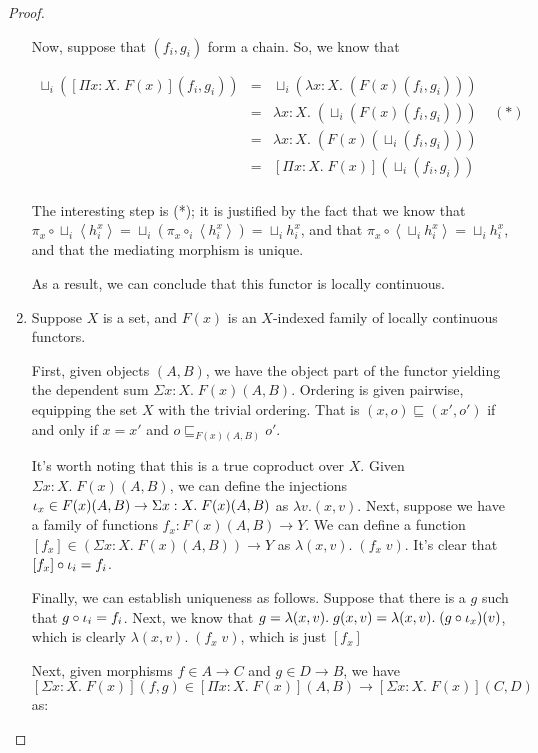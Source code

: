 \begin{proof}
\begin{enumerate}
Now, suppose that $(f_i,g_i)$ form a chain. So, we know that 

\begin{displaymath}
\begin{array}{lcl}
\sqcup_i ([\Pi x:X.\; F(x)](f_i,g_i)) & = & 
  \sqcup_i (\lambda x:X.\; (F(x) (f_i, g_i))) \\
& = & 
  \lambda x:X.\; (\sqcup_i (F(x) (f_i, g_i))) \;\;\;\;(*) \\
& = & 
  \lambda x:X.\; (F(x) (\sqcup_i (f_i, g_i))) \\
& = & 
[\Pi x:X.\; F(x)] (\sqcup_i (f_i,g_i)) \\
\end{array}
\end{displaymath}

The interesting step is (*); it is justified by the fact
that we know that $\pi_x \circ \sqcup_i \left<h^x_i\right> =  
\sqcup_i (\pi_x \circ_i \left<h^x_i\right>) = 
\sqcup_i h^x_i$, 
and that $\pi_x \circ \left<\sqcup_i h^x_i\right> 
          = \sqcup_i h^x_i$, 
and that the mediating morphism is unique.

As a result, we can conclude that this functor is locally 
continuous.

\item Suppose $X$ is a set, and $F(x)$ is an $X$-indexed family
of locally continuous functors. 

First, given objects $(A,B)$, we have the object part of the functor
yielding the dependent sum $\Sigma x:X.\; F(x)(A,B)$. Ordering is
given pairwise, equipping the set $X$ with the trivial ordering. 
That is $(x,o) \sqsubseteq (x', o')$ if and only if $x = x'$ and 
$o \sqsubseteq_{F(x)(A,B)} o'$. 

It's worth noting that this is a true coproduct over $X$. Given
$\Sigma x:X.\; F(x)(A,B)$, we can define the injections $\iota_{x} \in
F(x)(A,B) \to \Sigma x:X.\; F(x)(A,B)$ as $\lambda v. (x,v)$. 
Next, suppose we have a family of functions $f_x : F(x)(A,B) \to Y$. 
We can define a function $[f_x] \in (\Sigma x:X.\; F(x)(A,B)) \to Y$ as
$\lambda (x,v).\; (f_x\;v)$. It's clear that $[f_x]\circ \iota_{i} = f_i$. 

Finally, we can establish uniqueness as follows. Suppose that there 
is a $g$ such that $g \circ \iota_{i} = f_i$. Next, we know that 
$g = \lambda (x,v).\;g (x, v) = \lambda (x,v).\;(g\circ\iota_{x})(v)$,
which is clearly $\lambda (x,v).\; (f_x\;v)$, which is just $[f_x]$


Next, given morphisms $f \in A \to C$ and $g \in D \to B$, we have
$[\Sigma x:X.\; F(x)](f,g) \in [\Pi x:X.\; F(x)](A,B) \to [\Sigma x:X.\; F(x)](C,D)$
as:


\end{enumerate}
\end{proof}
